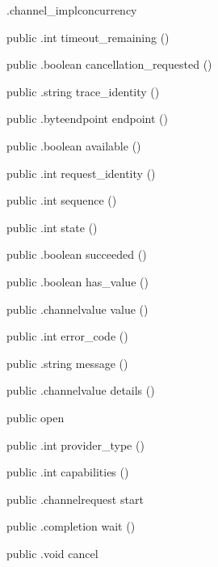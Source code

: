\begin{CrexxClass}{.channel\_impl}{concurrency}
\begin{Members}
    \Method
      {public}
      {.int}
      {timeout\_remaining}
      {()}

    \Method
      {public}
      {.boolean}
      {cancellation\_requested}
      {()}

    \Method
      {public}
      {.string}
      {trace\_identity}
      {()}

    \Method
      {public}
      {.byteendpoint}
      {endpoint}
      {()}

    \Method
      {public}
      {.boolean}
      {available}
      {()}

    \Method
      {public}
      {.int}
      {request\_identity}
      {()}

    \Method
      {public}
      {.int}
      {sequence}
      {()}

    \Method
      {public}
      {.int}
      {state}
      {()}

    \Method
      {public}
      {.boolean}
      {succeeded}
      {()}

    \Method
      {public}
      {.boolean}
      {has\_value}
      {()}

    \Method
      {public}
      {.channelvalue}
      {value}
      {()}

    \Method
      {public}
      {.int}
      {error\_code}
      {()}

    \Method
      {public}
      {.string}
      {message}
      {()}

    \Method
      {public}
      {.channelvalue}
      {details}
      {()}

    \Factory
      {public}
      {open}
      {}

    \Method
      {public}
      {.int}
      {provider\_type}
      {()}

    \Method
      {public}
      {.int}
      {capabilities}
      {()}

    \Method
      {public}
      {.channelrequest}
      {start}
      {}

    \Method
      {public}
      {.completion}
      {wait}
      {()}

    \Method
      {public}
      {.void}
      {cancel}
      {}


\end{Members}
\end{CrexxClass}
